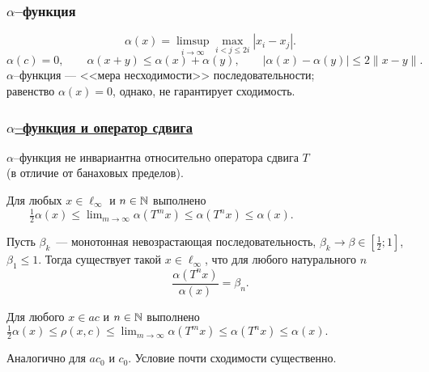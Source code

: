 \begin{frame}\frametitle{$\alpha$--функция}
	\begin{equation}
		\alpha(x) = \limsup_{i\to\infty} \max_{i<j\leqslant 2i} |x_i - x_j|
		.
	\end{equation}
	\vfill
	\begin{equation}
		\alpha(c)=0,
		\qquad
		\alpha(x+y) \leq \alpha(x) + \alpha(y),
		\qquad
		|\alpha(x) - \alpha(y)| \leq 2 \|x-y\|
		.
	\end{equation}
	\vfill
	$\alpha$--функция --- <<мера несходимости>> последовательности;
	\\
	равенство $\alpha(x) = 0$, однако, не гарантирует сходимость.

\end{frame}

\begin{frame}\frametitle{\underline{$\alpha$--функция и оператор сдвига}}
	\vfill
	$\alpha$--функция не инвариантна относительно оператора сдвига $T$
	\\
	(в отличие от банаховых пределов).

	\begin{ttheorem}
		Для любых $x\in\ell_\infty$ и $n \in \mathbb{N}$
		выполнено
		$\displaystyle\qquad
			\frac{1}{2}\alpha(x) \leq \lim_{m\to\infty} \alpha(T^m x)\leq\alpha(T^n x) \leq \alpha(x)
			.
		$
	\end{ttheorem}

	\vfill

	\begin{ttheorem}
		Пусть $\beta_k$~--- монотонная невозрастающая последовательность,
		$\beta_k \to \beta \in\left[\frac{1}{2}; 1\right]$, $\beta_1 \leq 1$.
		Тогда существует такой $x\in\ell_\infty$, что для любого натурального $n$
		\begin{equation}
			\frac{\alpha(T^n x)}{\alpha(x)} = \beta_n.
		\end{equation}
	\end{ttheorem}
	\vspace{-1.46em}
	\begin{ttheorem}
		\label{thm:rho_x_c_leq_alpha_t_s_x}
		Для любого $x\in ac$ и $n \in \mathbb{N}$
		выполнено
		$\displaystyle
			\frac{1}{2}\alpha(x) \leq \rho(x,c) \leq
			\lim_{m\to\infty} \alpha(T^m x)\leq \alpha(T^n x)
			\leq
			\alpha(x)
			.
		$
	\end{ttheorem}
	Аналогично для $ac_0$ и $c_0$. Условие почти сходимости существенно.

	\vfill
\end{frame}


